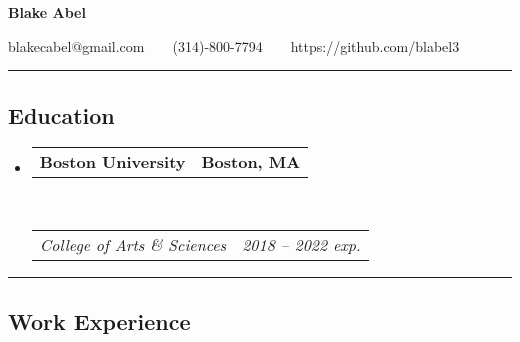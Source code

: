 \documentclass[11pt,letterpaper]{article}
\makeatletter
\newcommand{\headerrow}[2]
{\begin{tabular*}{\linewidth}{l@{\extracolsep{\fill}}r}
	#1 &
	#2 \\
\end{tabular*}}
\makeatother
\begin{document}
\begin{center}
{\LARGE \textbf{Blake Abel}}

blakecabel@gmail.com\ \ \textbullet \ \ (314)-800-7794\ \ \textbullet \ \ https://github.com/blabel3

\end{center}

\hrule
\vspace{-0.4em}
\subsection*{Education}

\begin{itemize}
	\parskip=0.1em

	\item 
	\headerrow
		{\textbf{Boston University}}
		{\textbf{Boston, MA}}
	\\
	\headerrow
		{\emph{College of Arts \& Sciences}}
		{\emph{2018 -- 2022 exp.}}
		

\end{itemize}

\hrule
\vspace{-0.4em}
\subsection*{Work Experience}
\end{document}
